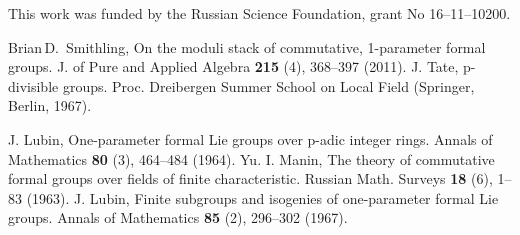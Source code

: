\documentclass[
11pt,%
tightenlines,%
twoside,%
onecolumn,%
nofloats,%
nobibnotes,%
nofootinbib,%
superscriptaddress,%
noshowpacs,%
centertags]%
{revtex4}
\begin{document}


\begin{acknowledgments}
This work was funded by the Russian Science Foundation, grant No
16--11--10200.
\end{acknowledgments}

\begin{thebibliography}{20}
            Brian\,D.~Smithling,  On the moduli stack of commutative, 1-parameter formal groups.
             J. of Pure and Applied Algebra \textbf{215} (4), 368--397 (2011).
             J. Tate, p-divisible groups. Proc. Dreibergen Summer School on Local Field (Springer, Berlin, 1967).

             J. Lubin, One-parameter formal Lie groups over p-adic integer rings. Annals of Mathematics
              \textbf{80} (3), 464--484 (1964).
             Yu. I. Manin, The theory of commutative formal groups over fields of finite characteristic.
              Russian Math. Surveys \textbf{18} (6), 1--83 (1963).
             J. Lubin, Finite subgroups and isogenies of one-parameter formal Lie groups. Annals of Mathematics
              \textbf{85} (2), 296--302 (1967).



\end{thebibliography}
\end{document}
